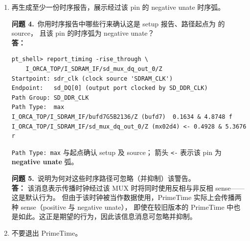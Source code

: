 \begin{enumerate}
\begin{questionBox}
\textbf{问题 2.}\ 该时序报告如何确认警告中的 pin 位于 data path（即时钟 source 被当作数据路径使用并约束），而非 clock path？\\[0.35em]
\textbf{答：} 若未生成报告（``path is unconstrained''），则该 pin 位于 clock path。
由于生成了时序报告，该 pin 位于 \textbf{data path}。

\textbf{问题 3.}\ 经过上述 pin 传播的是哪种 sense（positive unate 还是 negative unate）？
在时序报告中查找标示该 pin 的小箭头。\\[0.35em]
\textbf{答：} 经过该 pin 的是 \textbf{positive unate} 时序弧（fall to fall）。
数据通路中的相关行：
\begin{lstlisting}
I_ORCA_TOP/I_SDRAM_IF/bufd7G5B2136/Z (bufd7)  0.1634 & 4.8748 f
I_ORCA_TOP/I_SDRAM_IF/sd_mux_dq_out_0/Z (mx02d4) <- 0.5431 & 5.4179 f
\end{lstlisting}
箭头 \texttt{<-} 表示 negative unate；无箭头表示 positive unate。
\end{questionBox}

  \item 再生成至少一份时序报告，展示经过该 pin 的 negative unate 时序弧。

\begin{questionBox}
\textbf{问题 4.}\ 你用时序报告中哪些行来确认这是 setup 报告、路径起点为  的 source，
且该 pin 的时序弧为 negative unate？\\[0.35em]
\textbf{答：}\\
\begin{lstlisting}
pt_shell> report_timing -rise_through \
    I_ORCA_TOP/I_SDRAM_IF/sd_mux_dq_out_0/Z
Startpoint: sdr_clk (clock source 'SDRAM_CLK')
Endpoint:   sd_DQ[0] (output port clocked by SD_DDR_CLK)
Path Group: SD_DDR_CLK
Path Type:  max
I_ORCA_TOP/I_SDRAM_IF/bufd7G5B2136/Z (bufd7)  0.1634 & 4.8748 f
I_ORCA_TOP/I_SDRAM_IF/sd_mux_dq_out_0/Z (mx02d4) <- 0.4928 & 5.3676 r
\end{lstlisting}
\texttt{Path Type: max} 与起点确认 setup 及  source；
箭头 \texttt{<-} 表示该 pin 为 \textbf{negative unate} 弧。

\textbf{问题 5.}\ 说明为何对这些时序路径可忽略（并抑制）该警告。\\[0.35em]
\textbf{答：} 该消息表示传播时钟经过该 MUX 时将同时使用反相与非反相 sense——这是默认行为。
但由于该时钟被当作数据使用，PrimeTime 实际上会传播两种 sense（positive 与 negative unate），
即使在较旧版本的 PrimeTime 中也是如此。这正是期望的行为，因此该信息消息可忽略并抑制。
\end{questionBox}

  \item 不要退出 PrimeTime。
\end{enumerate}

